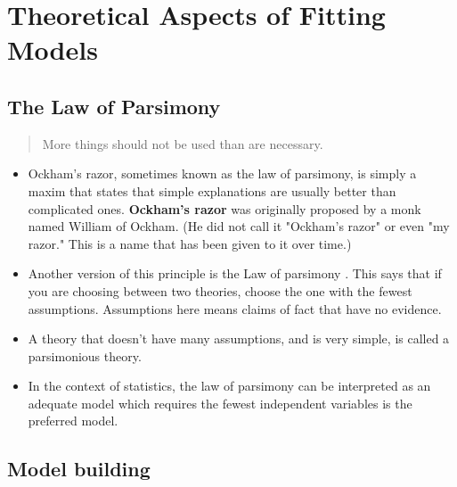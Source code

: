 \documentclass[a4paper,12pt]{article}
\begin{document}
\tableofcontents
\newpage

\section{Theoretical Aspects of Fitting Models}



\subsection{The Law of Parsimony}

\begin{framed}
	\begin{quotation}
		More things should not be used than are necessary.
	\end{quotation}
	
\end{framed}
\begin{itemize}
	\item Ockham's razor, sometimes known as the law of parsimony, is simply a maxim that states that simple explanations are usually better than complicated ones. \textbf{Ockham's razor} was originally proposed by a monk named William of Ockham. (He did not call it "Ockham's razor" or even "my razor." This is a name that has been given to it over time.)
	
	\item Another version of this principle is the Law of parsimony . This says that if you are choosing between two theories, choose the one with the fewest assumptions. Assumptions here means claims of fact that have no evidence.
	\item A theory that doesn't have many assumptions, and is very simple, is called a parsimonious theory.
	
	\item In the context of statistics, the law of parsimony can be interpreted as an adequate model which requires the fewest independent variables is the preferred model.
\end{itemize}






\subsection{Model building}
\end{document}
